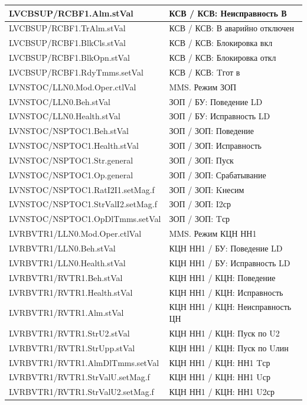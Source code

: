 \begin{longtable}{|>{\raggedright\arraybackslash}m{}|>{\raggedright\arraybackslash}m{}|}
\hline
LVCBSUP/RCBF1.Alm.stVal & КСВ / КСВ: Неисправность В \\
\hline
LVCBSUP/RCBF1.TrAlm.stVal & КСВ / КСВ: В аварийно отключен \\
\hline
LVCBSUP/RCBF1.BlkCls.stVal & КСВ / КСВ: Блокировка вкл \\
\hline
LVCBSUP/RCBF1.BlkOpn.stVal & КСВ / КСВ: Блокировка откл \\
\hline
LVCBSUP/RCBF1.RdyTmms.setVal & КСВ / КСВ: Tгот в \\
\hline
LVNSTOC/LLN0.Mod.Oper.ctlVal & MMS. Режим ЗОП \\
\hline
LVNSTOC/LLN0.Beh.stVal & ЗОП / БУ: Поведение LD \\
\hline
LVNSTOC/LLN0.Health.stVal & ЗОП / БУ: Исправность LD \\
\hline
LVNSTOC/NSPTOC1.Beh.stVal & ЗОП / ЗОП: Поведение \\
\hline
LVNSTOC/NSPTOC1.Health.stVal & ЗОП / ЗОП: Исправность \\
\hline
LVNSTOC/NSPTOC1.Str.general & ЗОП / ЗОП: Пуск \\
\hline
LVNSTOC/NSPTOC1.Op.general & ЗОП / ЗОП: Срабатывание \\
\hline
LVNSTOC/NSPTOC1.RatI2I1.setMag.f & ЗОП / ЗОП: Kнесим \\
\hline
LVNSTOC/NSPTOC1.StrValI2.setMag.f & ЗОП / ЗОП: I2ср \\
\hline
LVNSTOC/NSPTOC1.OpDlTmms.setVal & ЗОП / ЗОП: Tср \\
\hline
LVRBVTR1/LLN0.Mod.Oper.ctlVal & MMS. Режим КЦН НН1 \\
\hline
LVRBVTR1/LLN0.Beh.stVal & КЦН НН1 / БУ: Поведение LD \\
\hline
LVRBVTR1/LLN0.Health.stVal & КЦН НН1 / БУ: Исправность LD \\
\hline
LVRBVTR1/RVTR1.Beh.stVal & КЦН НН1 / КЦН: Поведение \\
\hline
LVRBVTR1/RVTR1.Health.stVal & КЦН НН1 / КЦН: Исправность \\
\hline
LVRBVTR1/RVTR1.Alm.stVal & КЦН НН1 / КЦН: Неисправность ЦН \\
\hline
LVRBVTR1/RVTR1.StrU2.stVal & КЦН НН1 / КЦН: Пуск по U2 \\
\hline
LVRBVTR1/RVTR1.StrUpp.stVal & КЦН НН1 / КЦН: Пуск по Uлин \\
\hline
LVRBVTR1/RVTR1.AlmDlTmms.setVal & КЦН НН1 / КЦН: НН1 Tср \\
\hline
LVRBVTR1/RVTR1.StrValU.setMag.f & КЦН НН1 / КЦН: НН1 Uср \\
\hline
LVRBVTR1/RVTR1.StrValU2.setMag.f & КЦН НН1 / КЦН: НН1 U2ср \\

\end{longtable}

